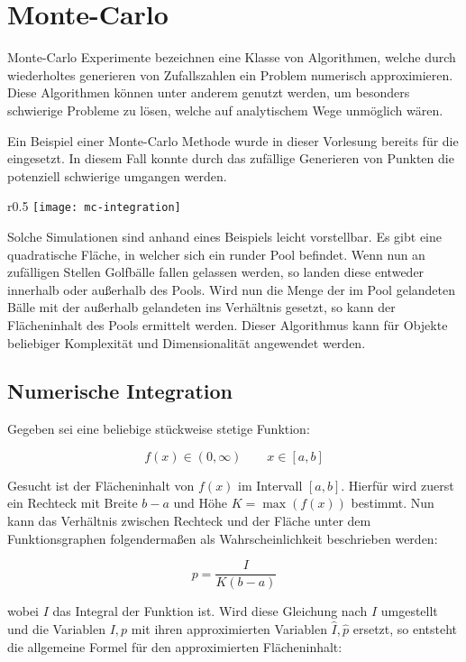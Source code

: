 \chapter{Monte-Carlo}

Monte-Carlo Experimente bezeichnen eine Klasse von Algorithmen, 
welche durch wiederholtes generieren von Zufallszahlen ein Problem numerisch approximieren.
Diese Algorithmen können unter anderem genutzt werden, um besonders schwierige Probleme zu lösen,
welche auf analytischem Wege unmöglich wären.

Ein Beispiel einer Monte-Carlo Methode wurde in dieser Vorlesung bereits für die  eingesetzt.
In diesem Fall konnte durch das zufällige Generieren von Punkten die potenziell schwierige  umgangen werden.
\\
\begin{wrapfigure}{r}{0.5\textwidth}
\centering
\texttt{[image: mc-integration]}
\end{wrapfigure}

Solche Simulationen sind anhand eines Beispiels leicht vorstellbar.
Es gibt eine quadratische Fläche, in welcher sich ein runder Pool befindet.
Wenn nun an zufälligen Stellen Golfbälle fallen gelassen werden, so landen diese entweder innerhalb oder außerhalb des Pools.
Wird nun die Menge der im Pool gelandeten Bälle mit der außerhalb gelandeten ins Verhältnis gesetzt,
so kann der Flächeninhalt des Pools ermittelt werden.
Dieser Algorithmus kann für Objekte beliebiger Komplexität und Dimensionalität angewendet werden.

\section{Numerische Integration}

Gegeben sei eine beliebige stückweise stetige Funktion:

\[f(x) \in (0, \infty) \qquad x \in [a,b]\]

Gesucht ist der Flächeninhalt von $f(x)$ im Intervall $[a,b]$.
Hierfür wird zuerst ein Rechteck mit Breite $b-a$ und Höhe $K = \max(f(x))$ bestimmt.
Nun kann das Verhältnis zwischen Rechteck und der Fläche unter dem Funktionsgraphen folgendermaßen als Wahrscheinlichkeit beschrieben werden:

\[p = \frac{I}{K(b-a)}\]

wobei $I$ das Integral der Funktion ist.
Wird diese Gleichung nach $I$ umgestellt und die Variablen $I,p$ mit ihren approximierten Variablen $\hat{I},\hat{p}$ ersetzt,
so entsteht die allgemeine Formel für den approximierten Flächeninhalt:

